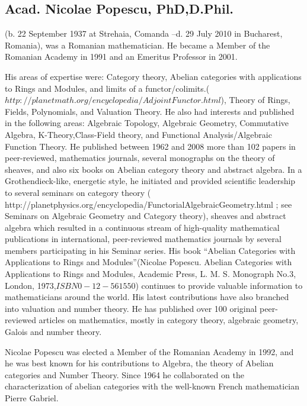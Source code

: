 \documentclass[12pt]{article}
\theoremstyle{plain}
\theoremstyle{definition}
\numberwithin{equation}{section}
\begin{document}
\subsection{Acad. Nicolae Popescu, PhD,D.Phil.} (b. 22 September 1937 at Strehaia, Comanda --d. 29 July 2010 in Bucharest, Romania), was a Romanian mathematician. He became a Member of the Romanian Academy in 1991 and an Emeritus Professor in 2001.
 
His areas of expertise were: Category theory, Abelian categories with applications to Rings and Modules, 
 and limits of a functor/colimits.($http://planetmath.org/encyclopedia/AdjointFunctor.html$), Theory of Rings, Fields, Polynomials, and Valuation Theory.  He also had interests and published in the following areas: Algebraic Topology, Algebraic Geometry, Commutative Algebra, K-Theory,Class-Field theory, and Functional Analysis/Algebraic Function Theory. He published between 1962 and 2008 more than 102 papers in peer-reviewed, mathematics journals, several monographs on the theory of sheaves, and also six books on Abelian category theory and abstract algebra. In a Grothendieck-like, energetic style, he initiated and provided scientific leadership to several seminars on category theory ( http://planetphysics.org/encyclopedia/FunctorialAlgebraicGeometry.html ; see Seminars on Algebraic Geometry and Category theory), sheaves and abstract algebra which resulted in a continuous stream of high-quality mathematical publications in international, peer-reviewed mathematics journals by several members participating in his Seminar series. His book ``Abelian Categories with Applications to Rings and Modules''(Nicolae Popescu. Abelian Categories with Applications to Rings and Modules, Academic Press, L. M. S. Monograph No.3, London, 1973,$ISBN 0-12-561550$) continues to provide valuable information to mathematicians around the world. His latest contributions have also branched into valuation and number theory. He has published over 100 original peer-reviewed articles on mathematics, mostly in category theory, algebraic geometry, Galois and number theory.

Nicolae Popescu was elected a Member of the Romanian Academy in 1992, and he was best known for his contributions to Algebra, the theory of Abelian categories and Number Theory. Since 1964 he collaborated on the characterization of abelian categories with the well-known French mathematician Pierre Gabriel.
\end{document}
